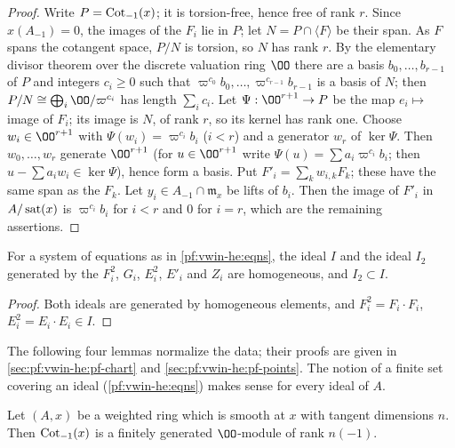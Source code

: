 \begin{proof}
Write $P=\operatorname{Cot}_{-1}(x)$; it is torsion-free, hence free of rank $r$. Since $x(A_{-1})=0$, the images of the
$F_i$ lie in $P$; let $N=P\cap\langle F\rangle$ be their span. As $F$ spans the cotangent space, $P/N$ is torsion,
so $N$ has rank $r$. By the elementary divisor theorem over the discrete valuation ring $\OO$ there are a basis
$b_0,\dots,b_{r-1}$ of $P$ and integers $c_i\ge0$ such that $\varpi^{c_0}b_0,\dots,\varpi^{c_{r-1}}b_{r-1}$ is a basis
of $N$; then $P/N\cong\bigoplus_i\OO/\varpi^{c_i}$ has length $\sum_ic_i$. Let $\Psi:\OO^{r+1}\to P$ be the map
$e_i\mapsto$ image of $F_i$; its image is $N$, of rank $r$, so its kernel has rank one. Choose $w_i\in\OO^{r+1}$ with
$\Psi(w_i)=\varpi^{c_i}b_i$ ($i<r$) and a generator $w_r$ of $\ker\Psi$. Then $w_0,\dots,w_r$ generate $\OO^{r+1}$
(for $u\in\OO^{r+1}$ write $\Psi(u)=\sum a_i\varpi^{c_i}b_i$; then $u-\sum a_iw_i\in\ker\Psi$), hence form a basis.
Put $F'_i=\sum_kw_{i,k}F_k$; these have the same span as the $F_k$. Let $y_i\in A_{-1}\cap\mathfrak m_x$ be lifts of
$b_i$. Then the image of $F'_i$ in $A/\operatorname{sat}(x)$ is $\varpi^{c_i}b_i$ for $i<r$ and $0$ for $i=r$, which are the
remaining assertions.
\end{proof}

\begin{lemma}[Homogeneity]\label{pf:vwin-he:hom}
For a system of equations as in \cref{pf:vwin-he:eqns}, the ideal $I$ and the ideal $I_2$ generated by the
$F_i^2$, $G_i$, $E_i^2$, $E'_i$ and $Z_i$ are homogeneous, and $I_2\subset I$.
\end{lemma}

\begin{proof}
Both ideals are generated by homogeneous elements, and $F_i^2=F_i\cdot F_i$, $E_i^2=E_i\cdot E_i\in I$.
\end{proof}

The following four lemmas normalize the data; their proofs are given in \cref{sec:pf:vwin-he:pf-chart} and
\cref{sec:pf:vwin-he:pf-points}. The notion of a finite set covering an ideal (\cref{pf:vwin-he:eqns}) makes sense for
every ideal of $A$.

\begin{lemma}\label{pf:vwin-he:rk}
Let $(A,x)$ be a weighted ring which is smooth at $x$ with tangent dimensions $n$. Then $\operatorname{Cot}_{-1}(x)$ is a
finitely generated $\OO$-module of rank $n(-1)$.
\end{lemma}

